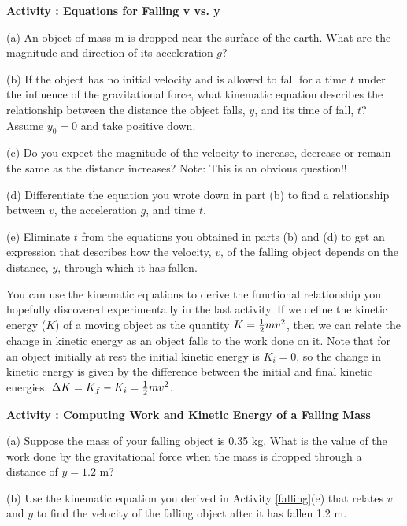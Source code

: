\textbf{Activity  : Equations for Falling v vs. y }

(a) An object of mass m is dropped near the surface of the earth. What are the
magnitude and direction of its acceleration $g$?
\vspace{10mm}

(b) If the object has no initial velocity and is allowed to fall for a time
$t$ under the influence of the gravitational force, what kinematic equation describes the relationship between the distance the object falls, $y$, and its time of fall, $t$? Assume \( y_{0}=0 \) and take positive down.
\vspace{10mm}

(c) Do you expect the magnitude of the velocity to increase, decrease or remain
the same as the distance increases? Note: This is an obvious question!!
\vspace{10mm}

(d) Differentiate the equation you wrote down in part (b) to find a relationship
between $v$, the acceleration $g$, and time $t$.
\vspace{20mm}

(e) Eliminate $t$ from the equations you obtained in parts (b) and (d) to get
an expression that describes how the velocity, $v$, 
of the falling object depends
on the distance, $y$, through which it has fallen. 
\vspace{20mm}

You can use the kinematic equations to derive the functional relationship you
hopefully discovered experimentally in the last activity. If we define the kinetic
energy ($K$) of a moving object as the quantity $K = {1\over 2}mv^{2}$, then we
can relate the change in kinetic energy as an object falls to the work done
on it. Note that for an object initially at rest the initial kinetic energy
is \(K _{i}=0\), so the change in kinetic energy is given by the difference
between the initial and final kinetic energies. \( \Delta  K = K _{f}
- K_{i}  = {1\over 2}mv^{2} \).

\textbf{Activity  : Computing Work and Kinetic Energy of a Falling Mass} 

(a) Suppose the mass of your falling object is 0.35 kg. What is the value of
the work done by the gravitational force when the mass is dropped through a
distance of $y = 1.2$ m? 
\vspace{20mm}

(b) Use the kinematic equation you derived in Activity \ref{falling}(e) that relates $v$ and
$y$ to find the velocity of the falling object after it has fallen 1.2 m.
\vspace{20mm}

